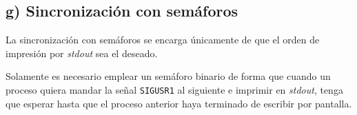 \documentclass{article}
\begin{document}
\subsection*{g) Sincronización con semáforos}

La sincronización con semáforos se encarga únicamente de que el orden de impresión por \textit{stdout} sea el deseado.

Solamente es necesario emplear un semáforo binario de forma que cuando un proceso quiera mandar la señal \texttt{SIGUSR1} al siguiente e imprimir en \textit{stdout}, tenga que esperar hasta que el proceso anterior haya terminado de escribir por pantalla. 
\end{document}
